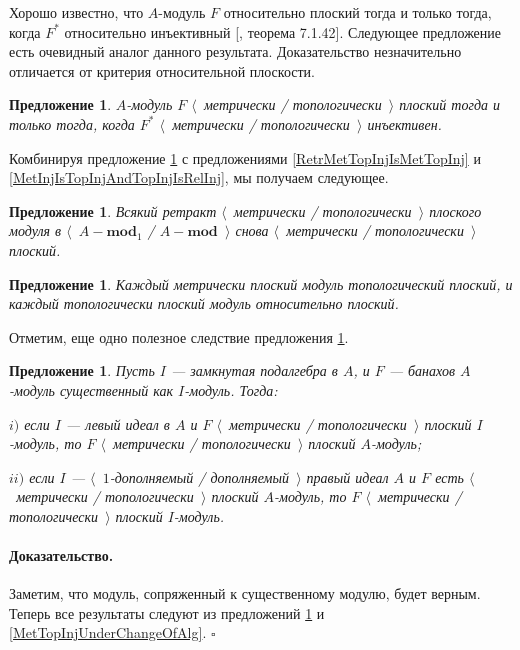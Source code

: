 \documentclass[12pt]{article}
\newtheorem{proposition}[theorem]{Предложение}
\renewenvironment{proof}{\paragraph{Доказательство.}}{\hfill$\square$\medskip}
\begin{document}
Хорошо известно, что $A$-модуль $F$ относительно плоский тогда и только тогда, когда $F^*$ относительно инъективный [\cite{HelBanLocConvAlg}, теорема 7.1.42]. Следующее предложение есть очевидный аналог данного результата. Доказательство незначительно отличается от критерия относительной плоскости.

\begin{proposition}\label{MetTopFlatCharac} $A$-модуль $F$ $\langle$~метрически / топологически~$\rangle$ плоский тогда и только тогда, когда $F^*$ $\langle$~метрически / топологически~$\rangle$ инъективен.
\end{proposition}

Комбинируя предложение \ref{MetTopFlatCharac} с предложениями \ref{RetrMetTopInjIsMetTopInj} и \ref{MetInjIsTopInjAndTopInjIsRelInj}, мы получаем следующее.

\begin{proposition}\label{RetrMetTopFlatIsMetTopFlat} Всякий ретракт $\langle$~метрически / топологически~$\rangle$ плоского модуля в $\langle$~$A-\mathbf{mod}_1$ / $A-\mathbf{mod}$~$\rangle$ снова $\langle$~метрически / топологически~$\rangle$ плоский.
\end{proposition}

\begin{proposition}\label{MetFlatIsTopFlatAndTopFlatIsRelFlat} Каждый метрически плоский модуль топологический плоский, и каждый топологически плоский модуль относительно плоский.
\end{proposition}

Отметим, еще одно полезное следствие предложения \ref{MetTopFlatCharac}.

\begin{proposition}\label{MetTopFlatUnderChangeOfAlg} Пусть $I$ --- замкнутая подалгебра в $A$, и $F$ --- банахов $A$-модуль существенный как $I$-модуль. Тогда:

$i)$ если $I$ --- левый идеал в $A$ и $F$ $\langle$~метрически / топологически~$\rangle$ плоский $I$-модуль, то $F$ $\langle$~метрически / топологически~$\rangle$ плоский $A$-модуль;

$ii)$ если $I$ --- $\langle$~$1$-дополняемый / дополняемый~$\rangle$ правый идеал $A$ и $F$ есть $\langle$~метрически / топологически~$\rangle$ плоский $A$-модуль, то $F$ $\langle$~метрически / топологически~$\rangle$ плоский $I$-модуль.
\end{proposition}
\begin{proof} Заметим, что модуль, сопряженный к существенному модулю, будет верным. Теперь все результаты следуют из предложений \ref{MetTopFlatCharac} и \ref{MetTopInjUnderChangeOfAlg}.
\end{proof}
\end{document}
